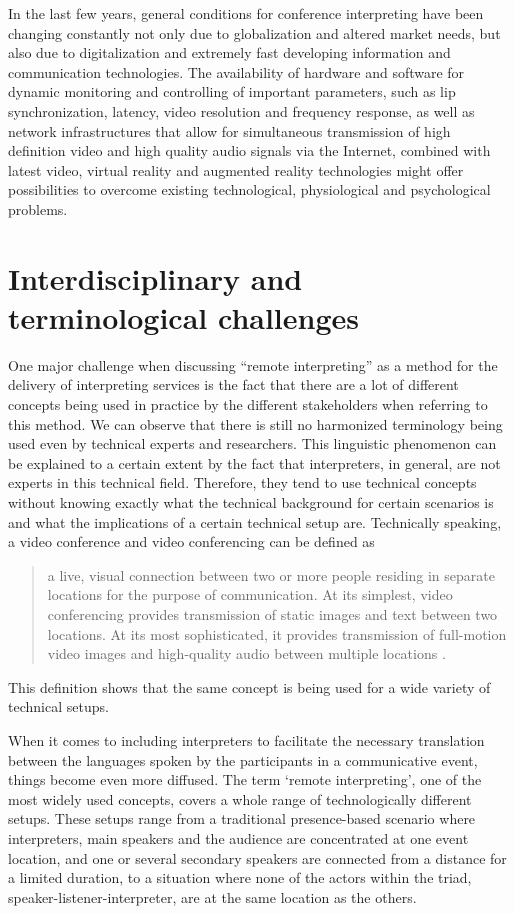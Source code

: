 \documentclass[output=paper]{langsci/langscibook}
\begin{document}
In the last few years, general conditions for conference interpreting have been changing constantly not only due to globalization and altered market needs, but also due to digitalization and extremely fast developing information and communication technologies. The availability of hardware and software for dynamic monitoring and controlling of important parameters, such as lip synchronization, latency, video resolution and frequency response, as well as network infrastructures that allow for simultaneous transmission of high definition video and high quality audio signals via the Internet, combined with latest video, virtual reality and augmented reality technologies might offer possibilities to overcome existing technological, physiological and psychological problems. 

\section{Interdisciplinary and terminological challenges}

\label{sec:ziegler:02}
One major challenge when discussing “remote interpreting” as a method for the delivery of interpreting services is the fact that there are a lot of different concepts being used in practice by the different stakeholders when referring to this method. We can observe that there is still no harmonized terminology being used even by technical experts and researchers. This linguistic phenomenon can be explained to a certain extent by the fact that interpreters, in general, are not experts in this technical field. Therefore, they tend to use technical concepts without knowing exactly what the technical background for certain scenarios is and what the implications of a certain technical setup are. 
Technically speaking, a video conference and video conferencing can be defined as 

\begin{quote}
	a live, visual connection between two or more people residing in separate locations for the purpose of communication. At its simplest, video conferencing provides transmission of static images and text between two locations. At its most sophisticated, it provides transmission of full-motion video images and high-quality audio between multiple locations \citep{TechTarget2017}.
\end{quote}

This definition shows that the same concept is being used for a wide variety of technical setups.

When it comes to including interpreters to facilitate the necessary translation between the languages spoken by the participants in a communicative event, things become even more diffused. The term ‘remote interpreting’, one of the most widely used concepts, covers a whole range of technologically different setups. These setups range from a traditional presence-based scenario where interpreters, main speakers and the audience are concentrated at one event location, and one or several secondary speakers are connected from a distance for a limited duration, to a situation where none of the actors within the triad, speaker-listener-interpreter, are at the same location as the others. 
\end{document}
